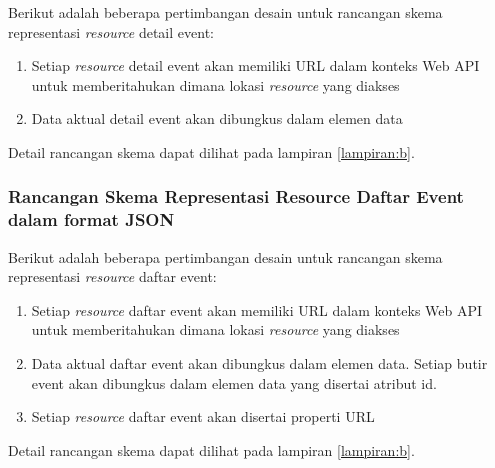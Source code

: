 \documentclass[a4paper, 12pt, oneside]{report}
\begin{document}
\onehalfspacing Berikut adalah beberapa pertimbangan desain untuk rancangan skema representasi \textit{resource} detail event:

\begin{enumerate}
  \item Setiap \textit{resource} detail event akan memiliki URL dalam konteks Web API untuk memberitahukan dimana lokasi \textit{resource} yang diakses
  \item Data aktual detail event akan dibungkus dalam elemen data
\end{enumerate}

Detail rancangan skema dapat dilihat pada lampiran \ref{lampiran:b}.

\subsubsection{Rancangan Skema Representasi Resource Daftar Event dalam format JSON}

\onehalfspacing Berikut adalah beberapa pertimbangan desain untuk rancangan skema representasi \textit{resource} daftar event:

\begin{enumerate}
  \item Setiap \textit{resource} daftar event akan memiliki URL dalam konteks Web API untuk memberitahukan dimana lokasi \textit{resource} yang diakses
  \item Data aktual daftar event akan dibungkus dalam elemen data. Setiap butir event akan dibungkus dalam elemen data yang disertai atribut id.
\item Setiap \textit{resource} daftar event akan disertai properti URL
\end{enumerate}

Detail rancangan skema dapat dilihat pada lampiran \ref{lampiran:b}.
\end{document}

